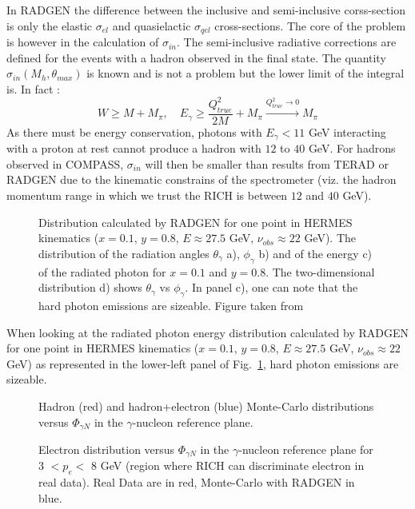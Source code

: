 %
In RADGEN the difference between the inclusive and semi-inclusive corss-section is only the elastic $\sigma_{el}$ and quasielactic $\sigma_{qel}$ cross-sections. The core of the problem is however in the calculation of $\sigma_{in}$. The semi-inclusive radiative corrections are defined for the events with a hadron observed in the final state. The quantity $\sigma_{in}(M_{h},\theta_{max})$ is known and is not a problem but the lower limit of the integral is. In fact :
%
\begin{equation}
    W \geqslant M + M_{\pi},\quad E_{\gamma} \geqslant \frac{Q^2_{true}}{2M}+M_{\pi} \xrightarrow{Q^2_{true} \rightarrow 0} M_{\pi}
\end{equation}
%
As there must be energy conservation, photons with $E_{\gamma} < 11$ GeV interacting with a proton at rest cannot produce a hadron with $12$ to $40$ GeV. For hadrons observed in COMPASS, $\sigma_{in}$ will then be smaller than results from TERAD or RADGEN due to the kinematic constrains of the spectrometer (viz. the hadron momentum range in which we trust the RICH is between $12$ and $40$ GeV).
%
\begin{figure}[htb]
\centerline{}
\caption{Distribution calculated by RADGEN for one point in HERMES kinematics ($x=0.1$, $y=0.8$, $E\approx27.5$ GeV, $\nu_{obs}\approx22$ GeV). The distribution of the radiation angles $\theta_{\gamma}$ a), $\phi_{\gamma}$ b) and of the energy c) of the radiated photon for $x=0.1$ and $y=0.8$. The two-dimensional distribution d) shows $\theta_{\gamma}$ vs $\phi_{\gamma}$. In panel c), one can note that the hard photon emissions are sizeable. Figure taken from \cite{RADGEN}}\label{fig:RAD}
\end{figure}

When looking at the radiated photon energy distribution calculated by RADGEN for one point in HERMES kinematics ($x=0.1$, $y=0.8$, $E\approx27.5$ GeV, $\nu_{obs}\approx22$ GeV) as represented in the lower-left panel of Fig.~\ref{fig:RAD}, hard photon emissions are sizeable.

\begin{figure}[htb!]
\centerline{}
\caption{Hadron (red) and hadron+electron (blue) Monte-Carlo distributions versus $\Phi_{\gamma N}$ in the $\gamma$-nucleon reference plane.}\label{fig:elprod}
\end{figure}

\begin{figure}[htb!]
\centerline{}
\caption{Electron distribution versus $\Phi_{\gamma N}$ in the $\gamma$-nucleon reference plane for 3 $< p_e <$ 8 GeV (region where RICH can discriminate electron in real data). Real Data are in red, Monte-Carlo with RADGEN in blue.}\label{fig:ph_pl}
\end{figure}

